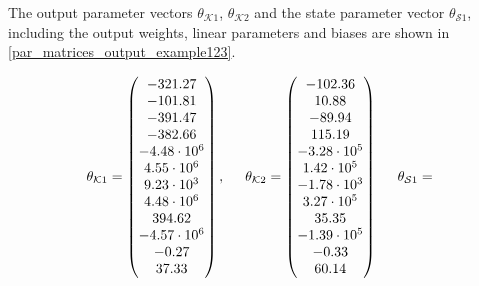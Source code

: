  \vspace{-4mm}

The output parameter vectors $\theta_{\mathcal{K}1}$, $\theta_{\mathcal{K}2}$ and the state parameter vector $\theta_{\mathcal{S}1}$, including the output weights, linear parameters and biases are shown in \eqref{par_matrices_output_example123}.

\vspace{-2mm}

 \begin{equation}
\label{par_matrices_output_example123}
         \theta_{\mathcal{K}1} = 
          \begin{pmatrix}
           -321.27  \\
           -101.81  \\
           -391.47  \\
           -382.66  \\
           -4.48 \cdot 10^6  \\
           4.55 \cdot 10^6 \\
           9.23 \cdot 10^3 \\
           4.48 \cdot 10^6 \\
           394.62 \\
           -4.57 \cdot 10^6\\
           -0.27 \\
           37.33 \\
         \end{pmatrix}
         ,
         \hspace{5mm}
         \theta_{\mathcal{K}2} = 
          \begin{pmatrix}
           -102.36  \\
           10.88  \\
           -89.94  \\
           115.19  \\
           -3.28 \cdot 10^5  \\
           1.42 \cdot 10^5 \\
           -1.78 \cdot 10^3 \\
           3.27 \cdot 10^5 \\
           35.35 \\
           -1.39 \cdot 10^5\\
           -0.33 \\
           60.14 \\
         \end{pmatrix}
\hspace{5mm}
         \theta_{\mathcal{S}1} = 

\end{equation}
